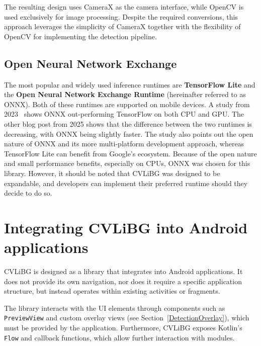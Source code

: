 The resulting design uses CameraX as the camera interface, while OpenCV is used exclusively for image processing. Despite the required conversions, this approach leverages the simplicity of CameraX together with the flexibility of OpenCV for implementing the detection pipeline.

\subsection{Open Neural Network Exchange}
\label{chosingInferenceRT}
The most popular and widely used inference runtimes are \textbf{TensorFlow Lite} and the \textbf{Open Neural Network Exchange Runtime} (hereinafter referred to as ONNX). Both of these runtimes are supported on mobile devices. A study from 2023~\cite{Ren2023_ONNX_TensorFlow_BScan} shows ONNX out-performing TensorFlow on both CPU and GPU. The other blog post \cite{aimtechnoOnnxTFcomparison} from 2025 shows that the difference between the two runtimes is decreasing, with ONNX being slightly faster. The study also points out the open nature of ONNX and its more multi-platform development approach, whereas TensorFlow Lite can benefit from Google's ecosystem. Because of the open nature and small performance benefits, especially on CPUs, ONNX was chosen for this library. However, it should be noted that CVLiBG was designed to be expandable, and developers can implement their preferred runtime should they decide to do so.



\section{Integrating CVLiBG into Android applications}
CVLiBG is designed as a library that integrates into Android applications. It does not provide its own navigation, nor does it require a specific application structure, but instead operates within existing activities or fragments.

The library interacts with the UI elements through components such as \texttt{PreviewView} 
and custom overlay views (see Section~\ref{DetectionOverlay}), which must be provided by the application. Furthermore, CVLiBG exposes Kotlin's \texttt{Flow} and callback functions, which allow further interaction with modules.

